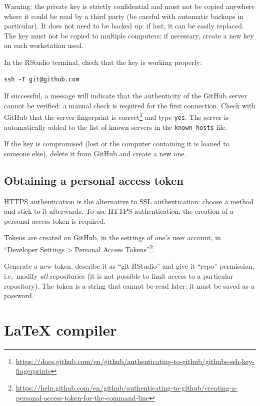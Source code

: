 \documentclass[
  12pt,
  american,
  a4paper,
  extrafontsizes,onecolumn,openright
  ]{memoir}
\begin{document}
Warning: the private key is strictly confidential and must not be copied anywhere where it could be read by a third party (be careful with automatic backups in particular).
It does not need to be backed up: if lost, it can be easily replaced.
The key must not be copied to multiple computers: if necessary, create a new key on each workstation used.

In the RStudio terminal, check that the key is working properly:

\begin{verbatim}
ssh -T git@github.com
\end{verbatim}

If successful, a message will indicate that the authenticity of the GitHub server cannot be verified: a manual check is required for the first connection.
Check with GitHub that the server fingerprint is correct\footnote{\url{https://docs.github.com/en/github/authenticating-to-github/githubs-ssh-key-fingerprints}} and type \texttt{yes}.
The server is automatically added to the list of known servers in the \texttt{known\_hosts} file.

If the key is compromised (lost or the computer containing it is loaned to someone else), delete it from GitHub and create a new one.

\subsection{Obtaining a personal access token}\label{sec:pat}

HTTPS authentication is the alternative to SSL authentication: choose a method and stick to it afterwards.
To use HTTPS authentication, the creation of a personal access token is required.

Tokens are created on GitHub, in the settings of one's user account, in \enquote{Developer Settings \textgreater{} Personal Access Tokens}\footnote{\url{https://help.github.com/en/github/authenticating-to-github/creating-a-personal-access-token-for-the-command-line}}.

Generate a new token, describe it as \enquote{git-RStudio} and give it \enquote{repo} permission, i.e.~modify \emph{all} repositories (it is not possible to limit access to a particular repository).
The token is a string that cannot be read later: it must be saved as a password.

\section{LaTeX compiler}\label{latex-compiler}
\end{document}
